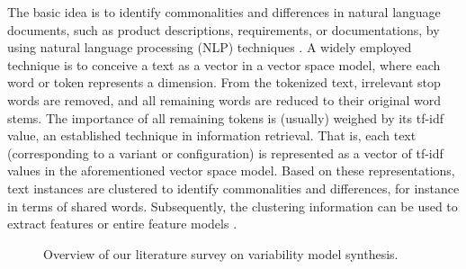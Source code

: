 The basic idea is to identify commonalities and differences in natural language
documents, such as product descriptions, requirements, or documentations, by
using natural language processing (NLP) techniques \citep{bakar_feature_2015}. A
widely employed technique is to conceive a text as a vector in a vector space model, where each word or
token represents a dimension. From the tokenized text, irrelevant stop words
are removed, and all remaining words are reduced to their original word stems.
The importance of all remaining tokens is (usually) weighed by its tf-idf
value, an established technique in information retrieval. That is, each text
(corresponding to a variant or configuration) is represented as a vector of
tf-idf values in the aforementioned vector space model. 
Based on these representations, text instances are clustered to identify
commonalities and differences, for instance in terms of shared words.
Subsequently, the clustering information can be used to extract features or entire feature
models \citep{alves_exploratory_2008,bakar_feature_2015}.

\begin{figure}[h!]
\centering
{}
\caption{Overview of our literature survey on
variability model synthesis.}\label{fig:varsynth_overview}
\end{figure}

